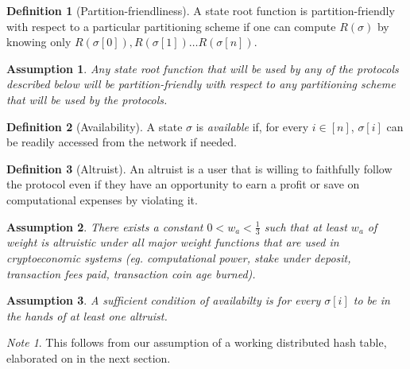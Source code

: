\documentclass[11pt,a4paper]{report}
\theoremstyle{plain}
\newtheorem{assm}{Assumption}[chapter]
\theoremstyle{definition}
\newtheorem{defn}{Definition}[chapter]
\theoremstyle{remark}
\newtheorem*{note}{Note}
\begin{document}
\begin{defn}[Partition-friendliness]
A state root function is partition-friendly with respect to a particular partitioning scheme if one can compute $R(\sigma)$ by knowing only $R(\sigma[0]), R(\sigma[1]) \ldots R(\sigma[n])$. 
\end{defn}

\begin{assm}
Any state root function that will be used by any of the protocols described below will be partition-friendly with respect to any partitioning scheme that will be used by the protocols.
\end{assm}

\begin{defn}[Availability]
A state $\sigma$ is \emph{available} if, for every $i \in [n]$, $\sigma[i]$ can be readily accessed from the network if needed.
\end{defn}

\begin{defn}[Altruist]
An altruist is a user that is willing to faithfully follow the protocol even if they have an opportunity to earn a profit or save on computational expenses by violating it.
\end{defn}

\begin{assm}
There exists a constant $0 < w_a < \frac{1}{3}$ such that at least $w_a$ of weight is altruistic under all major weight functions that are used in cryptoeconomic systems (eg. computational power, stake under deposit, transaction fees paid, transaction coin age burned).
\end{assm}

\begin{assm}
A sufficient condition of availabilty is for every $\sigma[i]$ to be in the hands of at least one altruist.
\end{assm}

\begin{note}
This follows from our assumption of a working distributed hash table, elaborated on in the next section.
\end{note}
\end{document}
